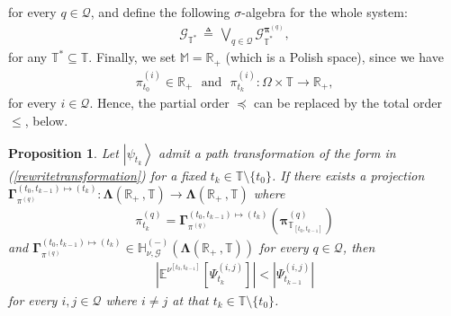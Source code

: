 \documentclass[12pt,a4paper]{article}
\newtheorem{prop}[thm]{Proposition}
\def\R{\mathbb{R}}
\def\M{\mathbb{M}}
\def\T{\mathbb{T}}
\def\G{\mathscr{G}}
\begin{document}
for every $q\in\mathcal{Q}$, and define the following $\sigma$-algebra for the whole system: 
\begin{align}
\G_{\T^*} \, \triangleq \, \bigvee_{q\in\mathcal{Q}}\G^{\boldsymbol{\pi}^{(q)}}_{\T^*} \label{wholesigmaalgebra}, 
\end{align}
for any $\T^*\subseteq\T$. Finally, we set $\M = \R_+$ (which is a Polish space), since we have
\begin{align}
\pi_{t_{0}}^{(i)} \in \R_+ \,\,\,\, \text{and} \,\,\,\,  \pi_{t_{k}}^{(i)} : \Omega \times \T \rightarrow \R_+, 
\end{align}
for every $i\in\mathcal{Q}$. Hence, the partial order $\preceq$ can be replaced by the total order $\leq$, below.
%
\begin{prop}
\label{mainproposition}
Let $\left|\psi_{t_{k}}\right\rangle$ admit a path transformation of the form in {\rm (\ref{rewritetransformation})} for a fixed $t_k\in\T\setminus\{t_0\}$. If there exists a projection $\boldsymbol{\Gamma}_{\pi^{(q)}}^{(t_0,t_{k-1})\mapsto(t_k)}: \boldsymbol{\Lambda}(\R_+ \,, \T) \rightarrow \boldsymbol{\Lambda}(\R_+ \,, \T)$ where 
\begin{align}
\pi^{(q)}_{t_{k}} = \boldsymbol{\Gamma}_{\pi^{(q)}}^{(t_0,t_{k-1})\mapsto(t_k)}\left(  \boldsymbol{\pi}_{\T_{[t_0,t_{k-1}]}}^{(q)} \right)  \label{projectionforpi}
\end{align}
and $\boldsymbol{\Gamma}_{\pi^{(q)}}^{(t_0,t_{k-1})\mapsto(t_k)} \in \mathbb{H}^{(-)}_{\nu,\G}(\boldsymbol{\Lambda}(\R_+ \,, \T))$ for every $q\in\mathcal{Q}$, then
\begin{align}
\left| \mathbb{E}^{\nu^{[t_{0},t_{k-1}]}}\left[\Psi_{t_{k}}^{(i,j)}\right] \right| < \left| \Psi_{t_{k-1}}^{(i,j)} \right| \label{decoheremceoffdiagnal}
\end{align}
for every $i,j\in\mathcal{Q}$ where $i\neq j$ at that $t_k\in\T\setminus\{t_0\}$.
\end{prop}
%
\end{document}
